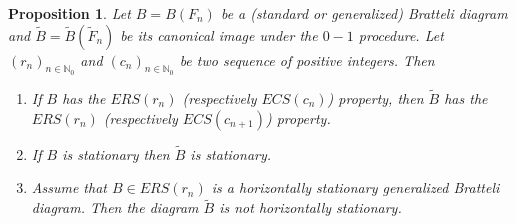 \documentclass[11pt,reqno]{amsart}
\theoremstyle{definition}
\theoremstyle{remark}
\theoremstyle{plain}
\newtheorem{prop}[definition]{Proposition}
\def\tl{\widetilde}
\newcommand{\N}{\mathbb N}
\numberwithin{equation}{section}
\begin{document}
\begin{prop}\label{prop:0-1properties} Let $B = B(F_n)$ be a (standard or generalized) Bratteli diagram and $\tl B = \tl B(\tl F_n)$ be its canonical image under the $0-1$ procedure. Let $(r_n)_{n \in \N_0}$ and $(c_n)_{n \in \N_0}$ be two sequence of positive integers. Then
    \begin{enumerate}[label=\upshape(\roman*), leftmargin=*, widest=iii]

        \item\label{item:0-1ers} If $B$ has the $ERS(r_n)$ (respectively $ECS(c_n)$) property, then $\tl B$ has the $ERS(r_n)$ (respectively $ECS(c_{n+1})$) property.

        \item\label{item:0-1stat} If $B$ is stationary then $\tl B$ is stationary.
        
        \item\label{item:0-1horstat} Assume that $B \in ERS(r_n)$ is a horizontally stationary generalized Bratteli diagram. Then the diagram $\tl B$ is not horizontally stationary. 
        

        
    \end{enumerate}
\end{prop}
\end{document}
